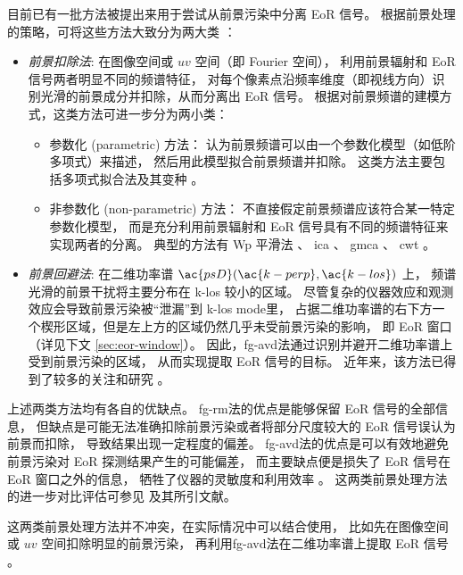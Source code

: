 目前已有一批方法被提出来用于尝试从前景污染中分离 EoR 信号。
根据前景处理的策略，可将这些方法大致分为两大类 \cite{chapman2015,chapman2016}：
\begin{itemize}
\item \emph{前景扣除法}:
在图像空间或 $uv$ 空间（即 Fourier 空间），
利用前景辐射和 EoR 信号两者明显不同的频谱特征，
对每个像素点沿频率维度（即视线方向）识别光滑的前景成分并扣除，从而分离出 EoR 信号。
根据对前景频谱的建模方式，这类方法可进一步分为两小类：
\begin{itemize}
  \item 参数化 (parametric) 方法：
    认为前景频谱可以由一个参数化模型（如低阶多项式）来描述，
    然后用此模型拟合前景频谱并扣除。
    这类方法主要包括多项式拟合法及其变种
    \cite{wang2006,jelic2008,liu2009fgrm,wang2013,bonaldi2015}。
  \item 非参数化 (non-parametric) 方法：
    不直接假定前景频谱应该符合某一特定参数化模型，
    而是充分利用前景辐射和 EoR 信号具有不同的频谱特征来实现两者的分离。
    典型的方法有 Wp 平滑法 \cite{harker2009}、
    \ac{ica} \cite{chapman2012}、
    \ac{gmca} \cite{chapman2013}、
    \ac{cwt} \cite{gu2013}。
\end{itemize}

\item \emph{前景回避法}:
在二维功率谱 $\ac{psD}(\ac{k-perp}, \ac{k-los})$ 上，
频谱光滑的前景干扰将主要分布在 \ac{k-los} 较小的区域。
尽管复杂的仪器效应和观测效应会导致前景污染被\enquote{泄漏}到 \ac{k-los} \ac{mode}里，
占据二维功率谱的右下方一个楔形区域，但是左上方的区域仍然几乎未受前景污染的影响，
即 EoR 窗口（详见下文 \autoref{sec:eor-window}）。
因此，\ac{fg-avd}法通过识别并避开二维功率谱上受到前景污染的区域，
从而实现提取 EoR 信号的目标。
近年来，该方法已得到了较多的关注和研究 \cite{thyagarajan2013,liu2014,liu2014ii,
  barry2016,beardsley2016,trott2016,patil2017}。

\end{itemize}

上述两类方法均有各自的优缺点。
\ac{fg-rm}法的优点是能够保留 EoR 信号的全部信息，
但缺点是可能无法准确扣除前景污染或者将部分尺度较大的 EoR 信号误认为前景而扣除，
导致结果出现一定程度的偏差。
\ac{fg-avd}法的优点是可以有效地避免前景污染对 EoR 探测结果产生的可能偏差，
而主要缺点便是损失了 EoR 信号在 EoR 窗口之外的信息，
牺牲了仪器的灵敏度和利用效率 \cite{pober2014}。
这两类前景处理方法的进一步对比评估可参见  及其所引文献。

这两类前景处理方法并不冲突，在实际情况中可以结合使用，
比如先在图像空间或 $uv$ 空间扣除明显的前景污染，
再利用\ac{fg-avd}法在二维功率谱上提取 EoR 信号 \cite{datta2010}。


